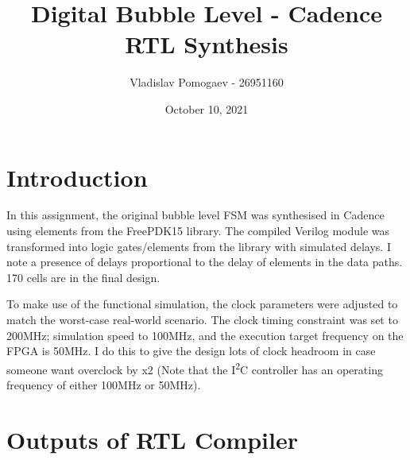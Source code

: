 \documentclass[11pt]{article}
\title{Digital Bubble Level - Cadence RTL Synthesis}
\author{Vladislav Pomogaev - 26951160}
\date{October 10, 2021}
\begin{document}
\maketitle

\section{Introduction}
In this assignment, the original bubble level FSM was synthesised in Cadence using elements from the FreePDK15 library. The compiled Verilog module was transformed into logic gates/elements from the library with simulated delays. I note a presence of delays proportional to the delay of elements in the data paths. 170 cells are in the final design.

To make use of the functional simulation, the clock parameters were adjusted to match the worst-case real-world scenario. The clock timing constraint was set to 200MHz; simulation speed to 100MHz, and the execution target frequency on the FPGA is 50MHz. I do this to give the design lots of clock headroom in case someone want overclock by x2 (Note that the I\textsuperscript{2}C controller has an operating frequency of either 100MHz or 50MHz). 

\section{Outputs of RTL Compiler}
\end{document}
